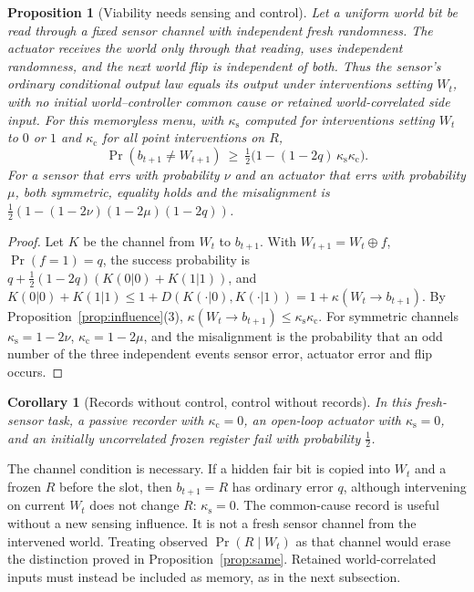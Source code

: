 \documentclass[11pt,a4paper]{article}
\newtheorem{proposition}[definition]{Proposition}
\newtheorem{corollary}[definition]{Corollary}
\begin{document}
\begin{proposition}[Viability needs sensing and control]
\label{prop:viable}
Let a uniform world bit be read through a fixed sensor channel with
independent fresh randomness. The actuator receives the world only through
that reading, uses independent randomness, and the next world flip is
independent of both. Thus the sensor's ordinary conditional output law
equals its output under interventions setting \(W_t\), with no initial
world--controller common cause or retained world-correlated side input.
For this memoryless menu, with $\kappa_{\mathrm s}$ computed for interventions
setting $W_t$ to $0$ or $1$ and $\kappa_{\mathrm c}$ for all point interventions on $R$,
\begin{equation}
\Pr(b_{t+1}\ne W_{t+1})\ \ge\ \tfrac12\bigl(1-(1-2q)\,\kappa_{\mathrm s}\kappa_{\mathrm c}\bigr).
\label{eq:viable}
\end{equation}
For a sensor that errs with probability $\nu$ and an actuator that errs with probability $\mu$, both symmetric, equality holds and the misalignment is $\frac12(1-(1-2\nu)(1-2\mu)(1-2q))$.
\end{proposition}

\begin{proof}
Let $K$ be the channel from $W_t$ to $b_{t+1}$. With $W_{t+1}=W_t\oplus f$, $\Pr(f=1)=q$, the success probability is $q+\frac12(1-2q)(K(0|0)+K(1|1))$, and $K(0|0)+K(1|1)\le1+D(K(\cdot|0),K(\cdot|1))=1+\kappa(W_t\to b_{t+1})$. By Proposition~\ref{prop:influence}(3), $\kappa(W_t\to b_{t+1})\le\kappa_{\mathrm s}\kappa_{\mathrm c}$. For symmetric channels $\kappa_{\mathrm s}=1-2\nu$, $\kappa_{\mathrm c}=1-2\mu$, and the misalignment is the probability that an odd number of the three independent events sensor error, actuator error and flip occurs.
\end{proof}

\begin{corollary}[Records without control, control without records]
In this fresh-sensor task, a passive recorder with
$\kappa_{\mathrm c}=0$, an open-loop actuator with
$\kappa_{\mathrm s}=0$, and an initially uncorrelated frozen register
fail with probability $\frac12$.
\end{corollary}

The channel condition is necessary. If a hidden fair bit is copied into
\(W_t\) and a frozen \(R\) before the slot, then \(b_{t+1}=R\)
has ordinary error \(q\), although intervening on current \(W_t\)
does not change \(R\): \(\kappa_{\mathrm s}=0\).
The common-cause record is useful without a new sensing influence.
It is not a fresh sensor channel from the intervened world. Treating
observed \(\Pr(R\mid W_t)\) as that channel would erase the distinction
proved in Proposition~\ref{prop:same}. Retained world-correlated inputs
must instead be included as memory, as in the next subsection.
\end{document}
